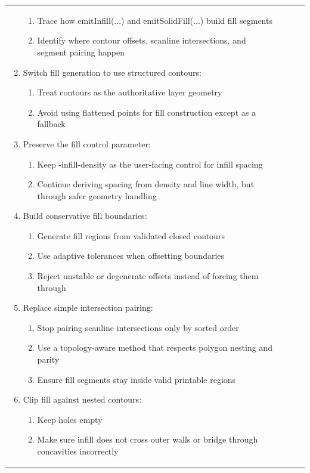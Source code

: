 \documentclass[10pt,twocolumn,a4paper]{article}
\begin{document}
\begin{longtable}{@{}p{0.6cm}p{1.5cm}p{11.0cm}p{2.7cm}@{}}
\begin{enumerate}
	\begin{enumerate}
		\item{Trace how emitInfill(...) and emitSolidFill(...) build fill segments}
		\item{Identify where contour offsets, scanline intersections, and segment pairing happen}
	\end{enumerate}
	\item{Switch fill generation to use structured contours:}
	\begin{enumerate}
		\item{Treat contours as the authoritative layer geometry}
		\item{Avoid using flattened points for fill construction except as a fallback}
	\end{enumerate}
	\item{Preserve the fill control parameter:}
	\begin{enumerate}
		\item{Keep -infill-density as the user-facing control for infill spacing}
		\item{Continue deriving spacing from density and line width, but through safer geometry handling}
	\end{enumerate}
	\item{Build conservative fill boundaries:}
	\begin{enumerate}
		\item{Generate fill regions from validated closed contours}
		\item{Use adaptive tolerances when offsetting boundaries}
		\item{Reject unstable or degenerate offsets instead of forcing them through}
	\end{enumerate}
	\item{Replace simple intersection pairing:}
	\begin{enumerate}
		\item{Stop pairing scanline intersections only by sorted order}
		\item{Use a topology-aware method that respects polygon nesting and parity}
		\item{Ensure fill segments stay inside valid printable regions}
	\end{enumerate}
	\item{Clip fill against nested contours:}
	\begin{enumerate}
		\item{Keep holes empty}
		\item{Make sure infill does not cross outer walls or bridge through concavities incorrectly}

\end{enumerate}
\end{enumerate}
\end{longtable}
\end{document}
